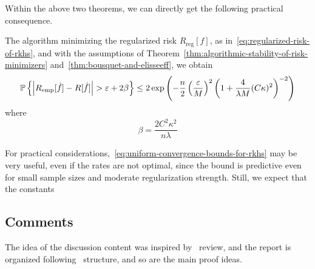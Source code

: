 Within the above two theorems, we can directly get the following practical consequence.
\begin{corollary}
	The algorithm minimizing the regularized risk \(R_{\text{reg}}[f]\), as in~\eqref{eq:regularized-risk-of-rkhs}, and with the assumptions of Theorem~\ref{thm:algorithmic-stability-of-risk-minimizers} and~\ref{thm:bousquet-and-elisseeff}, we obtain
	\begin{eqnarray}
		\label{eq:uniform-convergence-bounds-for-rkhs}
		\bbP\left\{\left|R_{\text{emp}}[\hat{f}]-R[\hat{f}]\right|>\varepsilon+2\beta\right\}\leq 2\exp\left(-\frac{n}{2}\left(\frac{\varepsilon}{M}\right)^{2}\left(1+\frac{4}{\lambda M}(C \kappa)^{2}\right)^{-2}\right)
	\end{eqnarray}
	where
	\begin{equation*}
		\beta=\frac{2C^{2}\kappa^{2}}{n\lambda}
	\end{equation*}
\end{corollary}

\begin{remark}
	For practical considerations,~\eqref{eq:uniform-convergence-bounds-for-rkhs} may be very useful, even if the rates are not optimal, since the bound is predictive even for small sample sizes and moderate regularization strength. Still, we expect that the constants
\end{remark}

\subsection*{Comments}

The idea of the discussion content was inspired by~\cite[Section 3]{hofmann2008kernel} review, and the report is organized following~\cite[Chapter 12]{scholkopf2002learning} structure, and so are the main proof ideas.

\printbibliography[heading=subbibliography]
